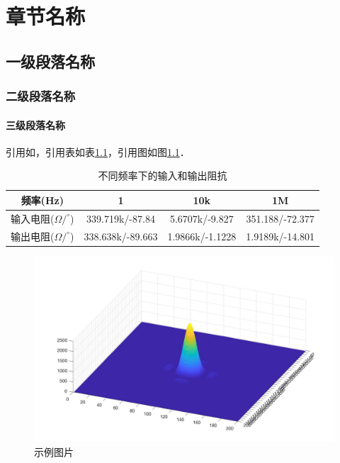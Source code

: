 \chapter{章节名称}
\section{一级段落名称}
\subsection{二级段落名称}
\subsubsection{三级段落名称}
引用如，引用表如表\ref{tab:input_output_r}，引用图如图\ref{fig:sample}．

\begin{table}[h]
	\small %
	\centering
	\caption{不同频率下的输入和输出阻抗}
	\label{tab:input_output_r}
	\begin{tabular}{cccc} %
		\toprule %
		频率(Hz) & 1 & 10k & 1M \\
		\midrule
		输入电阻($\Omega/^\circ$) & 339.719k/-87.84 & 5.6707k/-9.827 & 351.188/-72.377\\
		输出电阻($\Omega/^\circ$) & 338.638k/-89.663 & 1.9866k/-1.1228 & 1.9189k/-14.801 \\
		\bottomrule
	\end{tabular}
\end{table}

\begin{figure}[h]
	\centering
	\includegraphics[width=12cm]{sample.jpg}
	\caption{示例图片}
	\label{fig:sample}
\end{figure}
\clearpage
